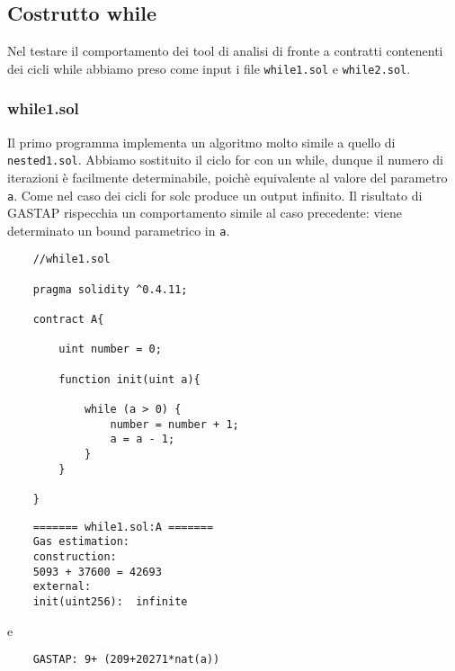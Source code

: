     \subsection{Costrutto while}
    
    Nel testare il comportamento dei tool di analisi di fronte a contratti contenenti dei cicli while abbiamo preso come input i file \verb|while1.sol| e \verb|while2.sol|.\newline
    
    \subsubsection{while1.sol}
    
    \indent Il primo programma implementa un algoritmo molto simile a quello di \verb|nested1.sol|. Abbiamo sostituito il ciclo for con un while, dunque il numero di iterazioni è facilmente determinabile, poichè equivalente al valore del parametro \verb|a|. Come nel caso dei cicli for solc produce un output infinito. Il risultato di GASTAP rispecchia un comportamento simile al caso precedente: viene determinato un bound parametrico in \verb|a|.\newline
    
    \begin{minipage}{\linewidth}
    \begin{lstlisting}
    //while1.sol

    pragma solidity ^0.4.11;

    contract A{

        uint number = 0;

        function init(uint a){
            
            while (a > 0) {
                number = number + 1;
                a = a - 1;
            }
        }

    }
    \end{lstlisting}
    \end{minipage}
    
    \begin{minipage}{\linewidth}
    \begin{lstlisting}
    ======= while1.sol:A =======
    Gas estimation:
    construction:
    5093 + 37600 = 42693
    external:
    init(uint256):	infinite
    \end{lstlisting}
    \end{minipage}

    
    e 
    \begin{lstlisting} 
    GASTAP: 9+ (209+20271*nat(a))
    \end{lstlisting}
    
